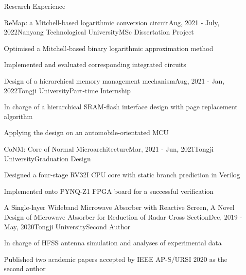 \documentclass{resume} %
\begin{document}
\begin{rSection}{Research Experience}
	
	\begin{rSubsection}{ReMap: a Mitchell-based logarithmic conversion circuit}{Aug, 2021 - July, 2022}{Nanyang Technological University}{MSc Dissertation Project}
		\item Optimised a Mitchell-based binary logarithmic approximation method
		\item Implemented and evaluated corresponding integrated circuits
	\end{rSubsection}

	\begin{rSubsection}{Design of a hierarchical memory management mechanism}{Aug, 2021 - Jan, 2022}{Tongji University}{Part-time Internship}
		\item In charge of a hierarchical SRAM-flash interface design with page replacement algorithm
		\item Applying the design on an automobile-orientated MCU
	\end{rSubsection}
	
	\begin{rSubsection}{CoNM: Core of Normal Microarchitecture}{Mar, 2021 - Jun, 2021}{Tongji University}{Graduation Design}
		\item Designed a four-stage RV32I CPU core with static branch prediction in Verilog
		\item Implemented onto PYNQ-Z1 FPGA board for a successful verification
	\end{rSubsection}

	\begin{rSubsection}{A Single-layer Wideband Microwave Absorber with Reactive Screen, A Novel Design of Microwave Absorber for Reduction of Radar Cross Section}{Dec, 2019 - May, 2020}{Tongji University}{Second Author}
		\item In charge of HFSS antenna simulation and analyses of experimental data
		\item Published two academic papers accepted by IEEE AP-S/URSI 2020 as the second author
	\end{rSubsection}

\end{rSection}

\newpage
\end{document}
